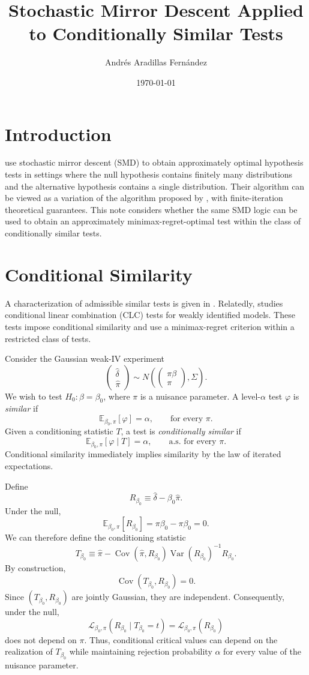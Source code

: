 \documentclass{article}
\title{Stochastic Mirror Descent Applied to Conditionally Similar Tests}
\author{Andr\'es Aradillas Fern\'andez}
\date{\today}
\theoremstyle{definition}
\theoremstyle{plain}
\theoremstyle{remark}
\begin{document}
\maketitle

\section{Introduction}

\cite{aradillas2025approximate} use stochastic mirror descent (SMD) to obtain approximately optimal hypothesis tests in settings where the null hypothesis contains finitely many distributions and the alternative hypothesis contains a single distribution. Their algorithm can be viewed as a variation of the algorithm proposed by \cite{elliott2015nearly}, with finite-iteration theoretical guarantees. This note considers whether the same SMD logic can be used to obtain an approximately minimax-regret-optimal test within the class of conditionally similar tests.

\section{Conditional Similarity}

A characterization of admissible similar tests is given in \cite{olea2020admissible}. Relatedly, \cite{andrews2016conditional} studies conditional linear combination (CLC) tests for weakly identified models. These tests impose conditional similarity and use a minimax-regret criterion within a restricted class of tests.

Consider the Gaussian weak-IV experiment
\[\begin{pmatrix}\hat{\delta}\\\hat{\pi}\end{pmatrix} \sim N\left(\begin{pmatrix}\pi\beta\\\pi\end{pmatrix},\Sigma\right).\]
We wish to test \(H_0:\beta=\beta_0\), where \(\pi\) is a nuisance parameter. A level-\(\alpha\) test \(\varphi\) is \emph{similar} if
\[\mathbb{E}_{\beta_0,\pi}[\varphi]=\alpha,\qquad \text{for every }\pi.\]
Given a conditioning statistic \(T\), a test is \emph{conditionally similar} if
\[\mathbb{E}_{\beta_0,\pi}[\varphi\mid T]=\alpha,\qquad \text{a.s. for every }\pi.\]
Conditional similarity immediately implies similarity by the law of iterated expectations.

Define
\[R_{\beta_0}\equiv \hat{\delta}-\beta_0\hat{\pi}.\]
Under the null,
\[\mathbb{E}_{\beta_0,\pi}[R_{\beta_0}]=\pi\beta_0-\pi\beta_0=0.\]
We can therefore define the conditioning statistic
\[T_{\beta_0}\equiv \hat{\pi}-\operatorname{Cov}(\hat{\pi},R_{\beta_0})\operatorname{Var}(R_{\beta_0})^{-1}R_{\beta_0}.\]
By construction,
\[\operatorname{Cov}(T_{\beta_0},R_{\beta_0})=0.\]
Since \((T_{\beta_0},R_{\beta_0})\) are jointly Gaussian, they are independent. Consequently, under the null,
\[\mathcal{L}_{\beta_0,\pi}(R_{\beta_0}\mid T_{\beta_0}=t)=\mathcal{L}_{\beta_0,\pi}(R_{\beta_0})\]
does not depend on \(\pi\). Thus, conditional critical values can depend on the realization of \(T_{\beta_0}\) while maintaining rejection probability \(\alpha\) for every value of the nuisance parameter.
\end{document}
